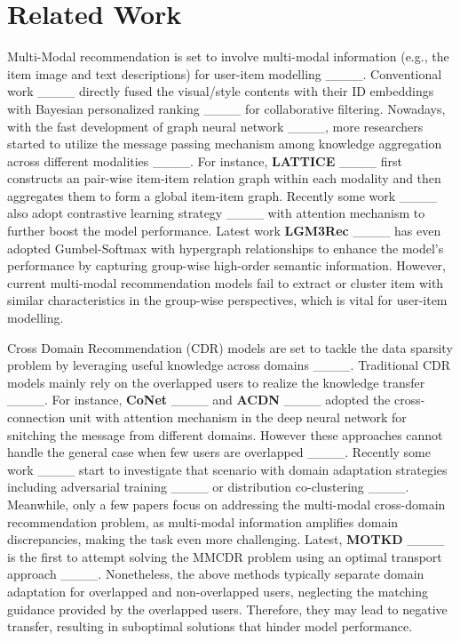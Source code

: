 \section{Related Work}
%
Multi-Modal recommendation is set to involve multi-modal information (e.g., the item image and text descriptions) for user-item modelling ____.
%
Conventional work ____ directly fused the visual/style contents with their ID embeddings with Bayesian personalized ranking ____ for collaborative filtering.
%
Nowadays, with the fast development of graph neural network ____, more researchers started to utilize the message passing mechanism among knowledge aggregation across different modalities ____.
%
For instance, \textbf{LATTICE} ____ first constructs an pair-wise item-item relation graph within each modality and then aggregates them to form a global item-item graph.
%
Recently some work ____ also adopt contrastive learning strategy ____ with attention mechanism to further boost the model performance.
%
Latest work \textbf{LGM3Rec} ____ has even adopted Gumbel-Softmax with hypergraph relationships to enhance the model's performance by capturing group-wise high-order semantic information.
%
However, current multi-modal recommendation models fail to extract or cluster item with similar characteristics in the group-wise perspectives, which is vital for user-item modelling.  






%
Cross Domain Recommendation (CDR) models are set to tackle the data sparsity problem by leveraging useful knowledge across domains ____.
%
Traditional CDR models mainly rely on the overlapped users to realize the knowledge transfer ____.
%
For instance, \textbf{CoNet} ____ and \textbf{ACDN} ____ adopted the cross-connection unit with attention mechanism in the deep neural network for snitching the message from different domains.
%
However these approaches cannot handle the general case when few users are overlapped ____.
%
Recently some work ____ start to investigate that scenario with domain adaptation strategies including adversarial training ____ or distribution co-clustering ____.
%
Meanwhile, only a few papers focus on addressing the multi-modal cross-domain recommendation problem, as multi-modal information amplifies domain discrepancies, making the task even more challenging.
%
Latest, \textbf{MOTKD} ____ is the first to attempt solving the MMCDR problem using an optimal transport approach ____.
%
Nonetheless, the above methods typically separate domain adaptation for overlapped and non-overlapped users, neglecting the matching guidance provided by the overlapped users.
%
Therefore, they may lead to negative transfer, resulting in suboptimal solutions that hinder model performance.


